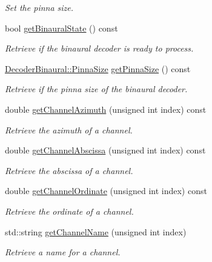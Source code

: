 \begin{DoxyCompactItemize}
\begin{DoxyCompactList}\small\item\em Set the pinna size. \end{DoxyCompactList}\item 
bool \hyperlink{class_hoa2_d_1_1_decoder_multi_a67e02e68e5ddaa18aa46e874ab5b6ad0}{get\-Binaural\-State} () const 
\begin{DoxyCompactList}\small\item\em Retrieve if the binaural decoder is ready to process. \end{DoxyCompactList}\item 
\hyperlink{class_hoa2_d_1_1_decoder_binaural_a29505dfc8fda1797dc2b059530f2383a}{Decoder\-Binaural\-::\-Pinna\-Size} \hyperlink{class_hoa2_d_1_1_decoder_multi_ae2a743eba5e9d38fe3a8edb833a9e1ce}{get\-Pinna\-Size} () const 
\begin{DoxyCompactList}\small\item\em Retrieve if the pinna size of the binaural decoder. \end{DoxyCompactList}\item 
double \hyperlink{class_hoa2_d_1_1_decoder_multi_a27e9a7dfb9e88e22470849f6f32c7270}{get\-Channel\-Azimuth} (unsigned int index) const 
\begin{DoxyCompactList}\small\item\em Retrieve the azimuth of a channel. \end{DoxyCompactList}\item 
double \hyperlink{class_hoa2_d_1_1_decoder_multi_a31085fe8704942e389e9e5cd00d195bd}{get\-Channel\-Abscissa} (unsigned int index) const 
\begin{DoxyCompactList}\small\item\em Retrieve the abscissa of a channel. \end{DoxyCompactList}\item 
double \hyperlink{class_hoa2_d_1_1_decoder_multi_a4a0032053910595155cf5299c883385b}{get\-Channel\-Ordinate} (unsigned int index) const 
\begin{DoxyCompactList}\small\item\em Retrieve the ordinate of a channel. \end{DoxyCompactList}\item 
std\-::string \hyperlink{class_hoa2_d_1_1_decoder_multi_af2208568e5aff57ade0ba5a00656db32}{get\-Channel\-Name} (unsigned int index)
\begin{DoxyCompactList}\small\item\em Retrieve a name for a channel. \end{DoxyCompactList}\item 

\end{DoxyCompactItemize}

